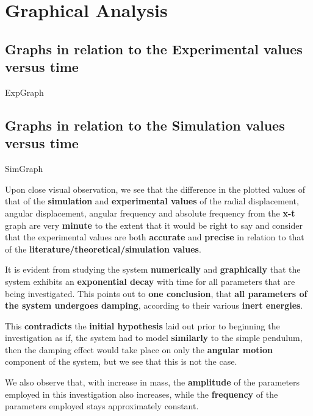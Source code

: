 \section{{Graphical Analysis}}
            
    \subsection{{Graphs in relation to the Experimental values versus time}}
            
        {ExpGraph}
            
    \subsection{{Graphs in relation to the Simulation values versus time}}
            
        {SimGraph}
            
            
    {Upon close visual observation, we see that the difference in the plotted values of that of the \textbf{simulation} and \textbf{experimental values} of the radial displacement, angular displacement, angular frequency and absolute frequency from the \textbf{x-t} graph are very \textbf{minute} to the extent that it would be right to say and consider that the experimental values are both \textbf{accurate} and \textbf{precise} in relation to that of the \textbf{literature/theoretical/simulation values}.}
        
	{It is evident from studying the system \textbf{numerically} and \textbf{graphically} that the system exhibits an \textbf{exponential decay} with time for all parameters that are being investigated. This points out to \textbf{one conclusion}, that \textbf{all parameters of the system undergoes damping}, according to their various \textbf{inert energies}.}
	 
	{This \textbf{contradicts} the \textbf{initial hypothesis} laid out prior to beginning the investigation as if, the system had to model \textbf{similarly} to the simple pendulum, then the damping effect would take place on only the \textbf{angular motion} component of the system, but we see that this is not the case.}        
        
    {We also observe that, with increase in mass, the \textbf{amplitude} of the parameters employed in this investigation also increases, while the \textbf{frequency} of the parameters employed stays approximately constant.}
        
    
    

